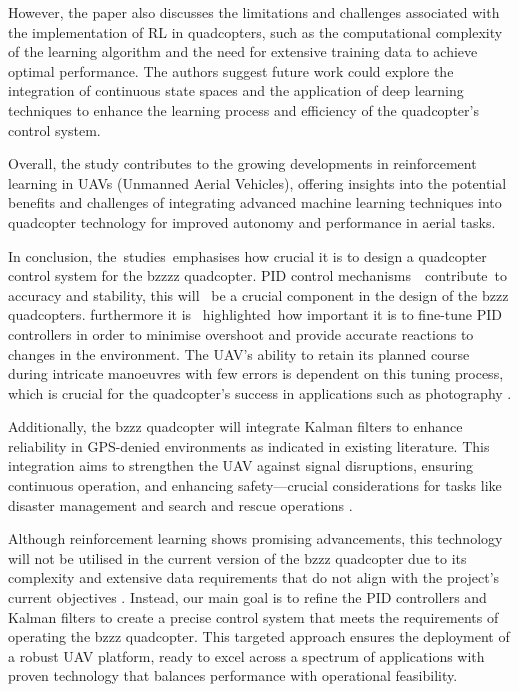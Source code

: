 \documentclass{report}
\begin{document}
However, the paper also discusses the limitations and challenges associated with
the implementation of RL in quadcopters, such as the computational complexity of
the learning algorithm and the need for extensive training data to achieve
optimal performance. The authors suggest future work could explore the
integration of continuous state spaces and the application of deep learning
techniques to enhance the learning process and efficiency of the quadcopter's
control system.

Overall, the study contributes to the growing developments in reinforcement
learning in UAVs (Unmanned Aerial Vehicles), offering insights into the
potential benefits and challenges of integrating advanced machine learning
techniques into quadcopter technology for improved autonomy and performance in
aerial tasks.

In conclusion, the studies emphasises how crucial it is to design a quadcopter
control system for the bzzzz quadcopter. PID control mechanisms  contribute to
accuracy and stability, this will  be a crucial component in the design of the
bzzz quadcopters. furthermore it is  highlighted how important it is to
fine-tune PID controllers in order to minimise overshoot and provide accurate
reactions to changes in the environment. The UAV's ability to retain its planned
course during intricate manoeuvres with few errors is dependent on this tuning
process, which is crucial for the quadcopter's success in applications such as
photography \cite{photographyAndVideo}.

Additionally, the bzzz quadcopter will integrate Kalman filters to enhance
reliability in GPS-denied environments as indicated in existing literature. This
integration aims to strengthen the UAV against signal disruptions, ensuring
continuous operation, and enhancing safety—crucial considerations for tasks like
disaster management \cite{disasterManagement} and search and rescue operations
\cite{searchAndRescue}.

Although reinforcement learning shows promising advancements, this technology
will not be utilised in the current version of the bzzz quadcopter due to its
complexity and extensive data requirements that do not align with the project's
current objectives \cite{ReinforcementLearning}. Instead, our main goal is to
refine the PID controllers and Kalman filters to create a precise control system
that meets the requirements of operating the bzzz quadcopter. This targeted
approach ensures the deployment of a robust UAV platform, ready to excel across
a spectrum of applications with proven technology that balances performance with
operational feasibility.
\end{document}
